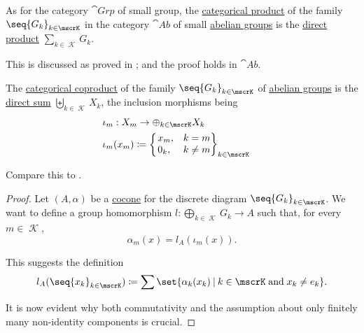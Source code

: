 \begin{proposition}\label{thm:abelian_group_categorical_limits}
  \hfill
  \begin{thmenum}
     As for the category \hyperref[def:group/category]{\( \cat{Grp} \)} of small group, the \hyperref[def:discrete_category_limits]{categorical product} of the family \( \seq{ G_k }_{k \in \mscrK} \) in the category \( \cat{Ab} \) of small \hyperref[def:abelian_group]{abelian groups} is the \hyperref[def:group_direct_product]{direct product} \( \sum_{k \in \mscrK} G_k \).

    This is discussed as proved in ; and the proof holds in \( \cat{Ab} \).

     The \hyperref[def:discrete_category_limits]{categorical coproduct} of the family \( \seq{ G_k }_{k \in \mscrK} \) of \hyperref[def:abelian_group]{abelian groups} is the \hyperref[def:group_direct_sum]{direct sum} \( \biguplus_{k \in \mscrK} X_k \), the inclusion morphisms being
    \begin{equation*}
      \begin{aligned}
         &\iota_m: X_m \to \oplus_{k \in \mscrK} X_k \\
         &\iota_m(x_m) \coloneqq \begin{cases}
          \begin{rcases}
            x_m, &k = m \\
            0_k, &k \neq m
          \end{rcases}_{k \in \mscrK}
        \end{cases}
      \end{aligned}
    \end{equation*}

    Compare this to .
  \end{thmenum}
\end{proposition}
\begin{proof}
   Let \( (A, \alpha) \) be a \hyperref[def:category_of_cones/cocone]{cocone} for the discrete diagram \( \seq{ G_k }_{k \in \mscrK} \). We want to define a group homomorphism \( l: \bigoplus_{k \in \mscrK} G_k \to A \) such that, for every \( m \in \mscrK \),
  \begin{equation*}
    \alpha_m(x) = l_A(\iota_m(x)).
  \end{equation*}

  This suggests the definition
  \begin{equation*}
    l_A(\seq{ x_k }_{k \in \mscrK}) \coloneqq \sum\set{ \alpha_k(x_k) \given k \in \mscrK \T{and} x_k \neq e_k }.
  \end{equation*}

  It is now evident why both commutativity and the assumption about only finitely many non-identity components is crucial.
\end{proof}

